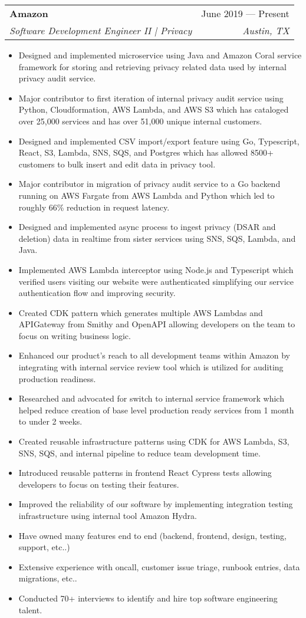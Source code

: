 \documentclass[letterpaper,11pt]{article}
\makeatletter
\newcommand{\resumeItem}[1]{
  \item\small{
    {#1 \vspace{-2pt}}
  }
}
\newcommand{\resumeSubheading}[4]{
  \vspace{-2pt}\item
    \begin{tabular*}{0.97\textwidth}[t]{l@{\extracolsep{\fill}}r}
      \textbf{#1} & #2 \\
      \textit{\small#3} & \textit{\small #4} \\
    \end{tabular*}\vspace{-7pt}
}
\newcommand{\resumeItemListStart}{\begin{itemize}}
\newcommand{\resumeItemListEnd}{\end{itemize}\vspace{-5pt}}
\makeatother
\begin{document}
    \resumeSubheading{Amazon}{June 2019 --- Present}{Software Development Engineer II | Privacy}{Austin, TX}
      \resumeItemListStart{}
        \resumeItem{Designed and implemented microservice using Java and Amazon Coral service framework for storing and retrieving privacy related data used by internal privacy audit service.}
        \resumeItem{Major contributor to first iteration of internal privacy audit service using Python, Cloudformation, AWS Lambda, and AWS S3 which has cataloged over 25,000 services and has over 51,000 unique internal customers.}  
        \resumeItem{Designed and implemented CSV import/export feature using Go, Typescript, React, S3, Lambda, SNS, SQS, and Postgres which has allowed 8500+ customers to bulk insert and edit data in privacy tool.}
        \resumeItem{Major contributor in migration of privacy audit service to a Go backend running on AWS Fargate from AWS Lambda and Python which led to roughly 66\% reduction in request latency.}
        \resumeItem{Designed and implemented async process to ingest privacy (DSAR and deletion) data in realtime from sister services using SNS, SQS, Lambda, and Java.}
        \resumeItem{Implemented AWS Lambda interceptor using Node.js and Typescript which verified users visiting our website were authenticated simplifying our service authentication flow and improving security.}
        \resumeItem{Created CDK pattern which generates multiple AWS Lambdas and APIGateway from Smithy and OpenAPI allowing developers on the team to focus on writing business logic.}
        \resumeItem{Enhanced our product’s reach to all development teams within Amazon by integrating with internal service review tool which is utilized for auditing production readiness.}
        \resumeItem{Researched and advocated for switch to internal service framework which helped reduce creation of base level production ready services from 1 month to under 2 weeks.}
        \resumeItem{Created reusable infrastructure patterns using CDK for AWS Lambda, S3, SNS, SQS, and internal pipeline to reduce team development time.}
        \resumeItem{Introduced reusable patterns in frontend React Cypress tests allowing developers to focus on testing their features.}
        \resumeItem{Improved the reliability of our software by implementing integration testing infrastructure using internal tool Amazon Hydra.}
        \resumeItem{Have owned many features end to end (backend, frontend, design, testing, support, etc..)}
        \resumeItem{Extensive experience with oncall, customer issue triage, runbook entries, data migrations, etc..}
        \resumeItem{Conducted 70+ interviews to identify and hire top software engineering talent.}
      \resumeItemListEnd{}
      
\end{document}
